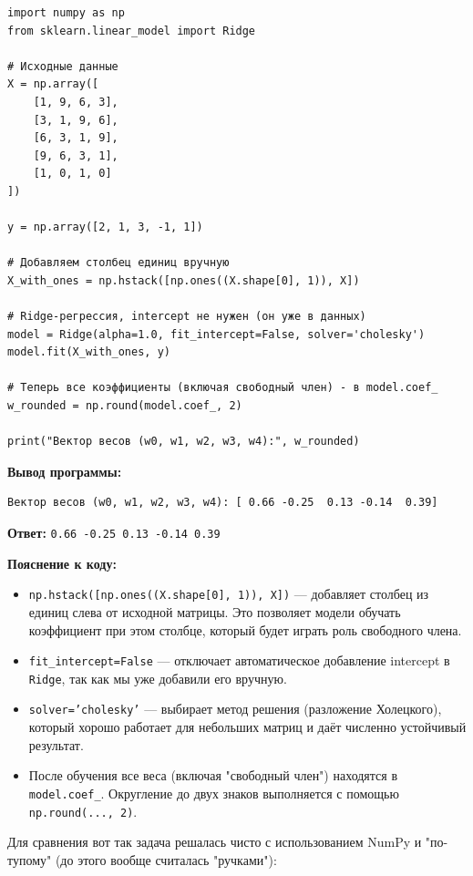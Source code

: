 \documentclass[pract]{SCWorks}
\begin{document}
\begin{verbatim}
import numpy as np
from sklearn.linear_model import Ridge

# Исходные данные
X = np.array([
    [1, 9, 6, 3],
    [3, 1, 9, 6],
    [6, 3, 1, 9],
    [9, 6, 3, 1],
    [1, 0, 1, 0]
])

y = np.array([2, 1, 3, -1, 1])

# Добавляем столбец единиц вручную
X_with_ones = np.hstack([np.ones((X.shape[0], 1)), X])

# Ridge-регрессия, intercept не нужен (он уже в данных)
model = Ridge(alpha=1.0, fit_intercept=False, solver='cholesky')
model.fit(X_with_ones, y)

# Теперь все коэффициенты (включая свободный член) - в model.coef_
w_rounded = np.round(model.coef_, 2)

print("Вектор весов (w0, w1, w2, w3, w4):", w_rounded)
\end{verbatim}

\textbf{Вывод программы:}

\begin{verbatim}
Вектор весов (w0, w1, w2, w3, w4): [ 0.66 -0.25  0.13 -0.14  0.39]
\end{verbatim}

\textbf{Ответ:} \texttt{0.66 -0.25  0.13 -0.14  0.39}

\textbf{Пояснение к коду:}
\begin{itemize}
    \item \texttt{np.hstack([np.ones((X.shape[0], 1)), X])} — добавляет столбец из единиц слева от исходной матрицы. Это позволяет модели обучать коэффициент при этом столбце, который будет играть роль свободного члена.
    \item \texttt{fit\_intercept=False} — отключает автоматическое добавление intercept в \texttt{Ridge}, так как мы уже добавили его вручную.
    \item \texttt{solver='cholesky'} — выбирает метод решения (разложение Холецкого), который хорошо работает для небольших матриц и даёт численно устойчивый результат.
    \item После обучения все веса (включая "свободный член") находятся в \texttt{model.coef\_}. Округление до двух знаков выполняется с помощью \texttt{np.round(..., 2)}.
\end{itemize}

Для сравнения вот так задача решалась чисто с использованием NumPy и "по-тупому" 
(до этого вообще считалась "ручками"):
\end{document}
